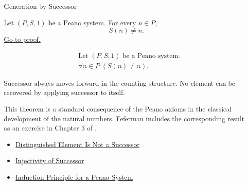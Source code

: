 \begin{topicbox}{Generation by Successor}
\begin{tcolorbox}[colback=thmbox, colframe=thmborder, arc=2pt,
  left=6pt, right=6pt, top=4pt, bottom=4pt,
  title={\small\textbf{Theorem (No Object Is Its Own Successor)}} ,
  fonttitle=\small\bfseries]
\begin{theorem}
\label{thm:no-object-is-its-own-successor}
Let $(P,S,1)$ be a Peano system. For every $n \in P$,
\[
S(n) \neq n.
\]
\hyperref[prf:no-object-is-its-own-successor]{Go to proof.}
\end{theorem}
\end{tcolorbox}

\begin{remark*}
\[
\begin{aligned}
&\text{Let } (P,S,1) \text{ be a Peano system.}\\
&\forall n \in P\;(S(n) \neq n).
\end{aligned}
\]
\end{remark*}

\begin{remark*}[Interpretation]
Successor always moves forward in the counting structure. No element can be
recovered by applying successor to itself.
\end{remark*}

\begin{remark*}
This theorem is a standard consequence of the Peano axioms in the classical
development of the natural numbers. Feferman includes the corresponding result
as an exercise in Chapter 3 of \citet{FefermanNumberSystems1964}.
\end{remark*}

\begin{remark*}[Dependencies]
\begin{itemize}
  \item \hyperref[ax:peano-one-not-successor]{Distinguished Element Is Not a Successor}
  \item \hyperref[ax:peano-successor-injective]{Injectivity of Successor}
  \item \hyperref[thm:induction-principle-for-peano-system]{Induction Principle for a Peano System}
\end{itemize}
\end{remark*}
\end{topicbox}

